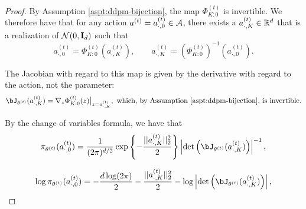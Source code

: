\begin{proof}
    By Assumption \ref{aspt:ddpm-bijection}, the map $ \Phi^{(t)}_{K:0}$ is invertible. We therefore have that for any action $a^{(t)}=a_{\cdot,0}^{(t)} \in {\mathcal{A}}$, there exists a $a_{\cdot,K}^{(t)} \in {\mathbb{R}}^d$ that is a realization of ${\mathcal{N}}(0, \mathbf{I}_d)$ such that 
    $$a_{\cdot,0}^{(t)} = \Phi^{(t)}_{K:0}(a_{\cdot,K}^{(t)}), \qquad
    a_{\cdot,K}^{(t)} = \left(\Phi^{(t)}_{K:0}\right)^{-1}(a_{\cdot,0}^{(t)}).$$

    The Jacobian with regard to this map is given by the derivative with regard to the action, not the parameter:
    $$\bJ_{\theta^{(t)}}(a_{\cdot,K}^{(t)}) = \nabla_z \Phi^{(t)}_{K:0}(z) \big|_{z=a_{\cdot,K}^{(t)}}, \text{ which, by Assumption \ref{aspt:ddpm-bijection}, is invertible} .$$

    By the change of variables formula, we have that
    $$\pi_{\theta^{(t)}}(a_{\cdot,0}^{(t)}) = \frac{1}{(2\pi)^{d/2}}\exp\left\{-\frac{||a_{\cdot,K}^{(t)}||_2^2}{2}\right\}\left|\det\left(\bJ_{\theta^{(t)}}(a_{\cdot,K}^{(t)})\right)\right|^{-1},$$
    
    $$\log \pi_{\theta^{(t)}}(a_{\cdot,0}^{(t)}) = -\frac{d\log(2\pi)}{2} - \frac{||a_{\cdot,K}^{(t)}||_2^2}{2} - \log \left|\det\left(\bJ_{\theta^{(t)}}(a_{\cdot,K}^{(t)})\right)\right|,$$


\end{proof}
